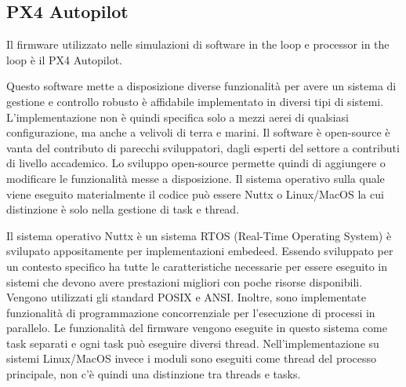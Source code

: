 \begin{it}
	\chapter{PX4 Autopilot}
	Il firmware utilizzato nelle simulazioni di software in the loop e processor in the loop è il PX4 Autopilot.
		
	Questo software mette a disposizione diverse funzionalità per avere un sistema di gestione e controllo robusto è affidabile implementato in diversi tipi di sistemi. L'implementazione non è quindi specifica solo a mezzi aerei di qualsiasi configurazione, ma anche a velivoli di terra e marini. Il software è open-source è vanta del contributo di parecchi sviluppatori, dagli esperti del settore a contributi di livello accademico. Lo sviluppo open-source permette quindi di aggiungere o modificare le funzionalità messe a disposizione. Il sistema operativo sulla quale viene eseguito materialmente il codice può essere Nuttx o Linux/MacOS la cui distinzione è solo nella gestione di task e thread.
	
	Il sistema operativo Nuttx è un sistema RTOS (Real-Time Operating System) è svilupato appositamente per implementazioni embedeed. Essendo sviluppato per un contesto specifico ha tutte le caratteristiche necessarie per essere eseguito in sistemi che devono avere prestazioni migliori con poche risorse disponibili. Vengono utilizzati gli standard POSIX e ANSI. Inoltre, sono implementate funzionalità di programmazione concorrenziale per l'esecuzione di processi in parallelo. Le funzionalità del firmware vengono eseguite in questo sistema come task separati e ogni task può eseguire diversi thread.
	Nell'implementazione su sistemi Linux/MacOS invece i moduli sono eseguiti come thread del processo principale, non c'è quindi una distinzione tra threads e tasks.
\end{it}

